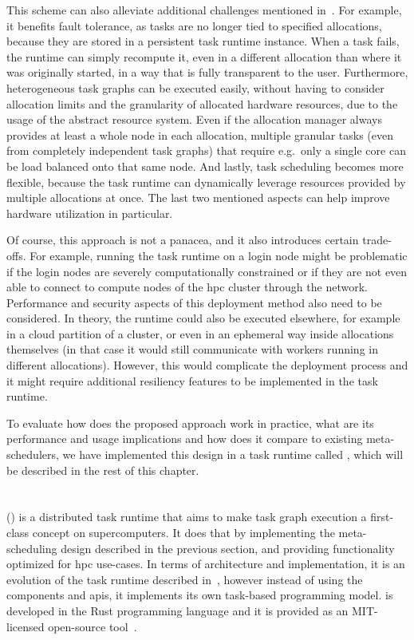 This scheme can also alleviate additional challenges mentioned in~. For
example, it benefits fault tolerance, as tasks are no longer tied to specified allocations, because
they are stored in a persistent task runtime instance. When a task fails, the runtime can simply
recompute it, even in a different allocation than where it was originally started, in a way that is
fully transparent to the user. Furthermore, heterogeneous task graphs can be executed easily,
without having to consider allocation limits and the granularity of allocated hardware resources,
due to the usage of the abstract resource system. Even if the allocation manager always provides at
least a whole node in each allocation, multiple granular tasks (even from completely independent
task graphs) that require e.g.\ only a single core can be load balanced onto that same node. And
lastly, task scheduling becomes more flexible, because the task runtime can dynamically leverage
resources provided by multiple allocations at once. The last two mentioned aspects can help improve
hardware utilization in particular.

Of course, this approach is not a panacea, and it also introduces certain trade-offs. For example,
running the task runtime on a login node might be problematic if the login nodes are severely
computationally constrained or if they are not even able to connect to compute nodes of the
\gls{hpc} cluster through the network. Performance and security aspects of this
deployment method also need to be considered. In theory, the runtime could also be executed
elsewhere, for example in a cloud partition of a cluster, or even in an ephemeral way inside
allocations themselves (in that case it would still communicate with workers running in different
allocations). However, this would complicate the deployment process and it might require additional
resiliency features to be implemented in the task runtime.

To evaluate how does the proposed approach work in practice, what are its performance and usage
implications and how does it compare to existing meta-schedulers, we have implemented this design
in a task runtime called \hyperqueue{}, which will be described in the rest of this
chapter.

\section{\hyperqueue{}}
\hyperqueue{} (\hq{}) is a distributed task runtime that aims to make task graph execution a
first-class concept on supercomputers. It does that by implementing the meta-scheduling design
described in the previous section, and providing functionality optimized for
\gls{hpc} use-cases. In terms of architecture and implementation, it is an evolution
of the \rsds{} task runtime described in~, however instead
of using the \dask{} components and \glspl{api}, it implements its own
task-based programming model. \hyperqueue{} is developed in the Rust programming language
and it is provided as an \mbox{MIT-licensed} open-source tool~\cite{hq_github}.

